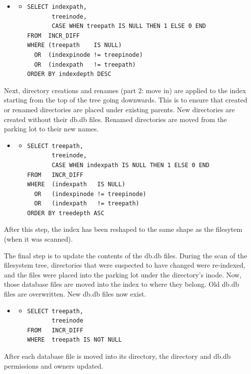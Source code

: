   \begin{itemize} %
    \item[] \begin{itemize} %
      \item[] \begin{verbatim}
SELECT indexpath,
       treeinode,
       CASE WHEN treepath IS NULL THEN 1 ELSE 0 END
FROM  INCR_DIFF
WHERE (treepath    IS NULL)
  OR  (indexpinode != treepinode)
  OR  (indexpath   != treepath)
ORDER BY indexdepth DESC
      \end{verbatim}
    \end{itemize}
  \end{itemize}

Next, directory creations and renames (part 2: move in) are applied to
the index starting from the top of the tree going downwards. This is
to ensure that created or renamed directories are placed under
existing parents. New directories are created without their db.db
files. Renamed directories are moved from the parking lot to their new
names.

  \begin{itemize} %
    \item[] \begin{itemize} %
      \item[] \begin{verbatim}
SELECT treepath,
       treeinode,
       CASE WHEN indexpath IS NULL THEN 1 ELSE 0 END
FROM   INCR_DIFF
WHERE  (indexpath   IS NULL)
  OR   (indexpinode != treepinode)
  OR   (indexpath   != treepath)
ORDER BY treedepth ASC
      \end{verbatim}
    \end{itemize}
  \end{itemize}

After this step, the index has been reshaped to the same shape as the
filesytem (when it was scanned).

The final step is to update the contents of the db.db files. During
the scan of the filesystem tree, directories that were suspected to
have changed were re-indexed, and the files were placed into the
parking lot under the directory's inode. Now, those database files are
moved into the index to where they belong. Old db.db files are
overwritten. New db.db files now exist.

  \begin{itemize} %
    \item[] \begin{itemize} %
      \item[] \begin{verbatim}
SELECT treepath,
       treeinode
FROM   INCR_DIFF
WHERE  treepath IS NOT NULL
      \end{verbatim}
    \end{itemize}
  \end{itemize}

After each database file is moved into its directory, the directory
and db.db permissions and owners updated.

